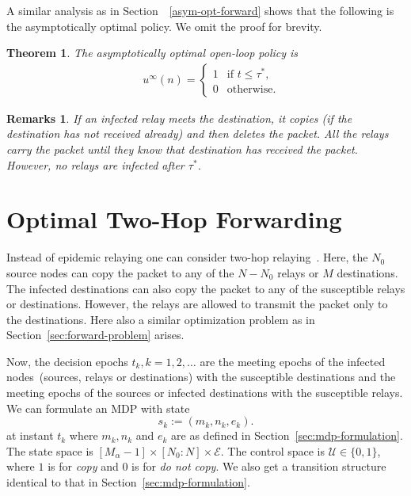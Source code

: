 \documentclass[10pt,journal,letterpaper]{IEEEtran}
\newtheorem{theorem}{Theorem}[section]
\newtheorem{remarks}{Remarks}[section]
\begin{document}
{A similar analysis as in Section~~\ref{asym-opt-forward} shows that the following is the asymptotically
optimal policy. We omit the proof for brevity.
\begin{theorem}
\label{theorem:asym-optimal-sd}
The asymptotically optimal open-loop policy is
\begin{align*}
&~u^{\infty}(n) = \begin{cases}
                 1  & \mbox{if } t \leq \tau^{\ast}, \\
                 0  & \mbox{otherwise.}\end{cases}
\end{align*}
\end{theorem}
\begin{remarks}
If an infected relay meets the destination, it copies (if the destination has not
received already) and then deletes the packet. All the relays carry the packet
until they know that destination has received the packet. However, no relays are
infected after  $\tau^{\ast}$.
\end{remarks}
}

\section{Optimal Two-Hop Forwarding}
\label{sec:two-hop}
Instead of epidemic relaying one can consider two-hop
relaying~\cite{comnet-wireless.grossglauser-tse02mobility-adhoc-networks}.
Here, the $N_0$ source nodes can copy the packet
to any of the $N-N_0$ relays or $M$ destinations.
The infected destinations can also copy the packet to
any of the susceptible relays or destinations.
However, the relays are allowed to transmit the packet only
to the destinations. Here also a similar optimization problem as in
Section~\ref{sec:forward-problem} arises.


Now, the decision epochs $t_k, k = 1,2,\dots$ are the meeting epochs of the infected nodes~(sources, relays or destinations)
with the susceptible destinations and the meeting epochs of the sources or infected destinations with the susceptible relays.
We can formulate an MDP with state
\begin{equation*}
s_k := (m_k, n_k, e_k).
\end{equation*}
at instant $t_k$ where $m_k, n_k$ and  $e_k$ are as defined in
Section~\ref{sec:mdp-formulation}. The state space is $[M_{\alpha}-1] \times [N_0:N] \times
 \mathcal{E}$. The control space is
$\mathcal{U} \in \{0,1\}$, where $1$ is for {\it copy} and $0$ is for {\it do not copy}.
We also get a transition structure identical  to that in Section~\ref{sec:mdp-formulation}.
\end{document}
